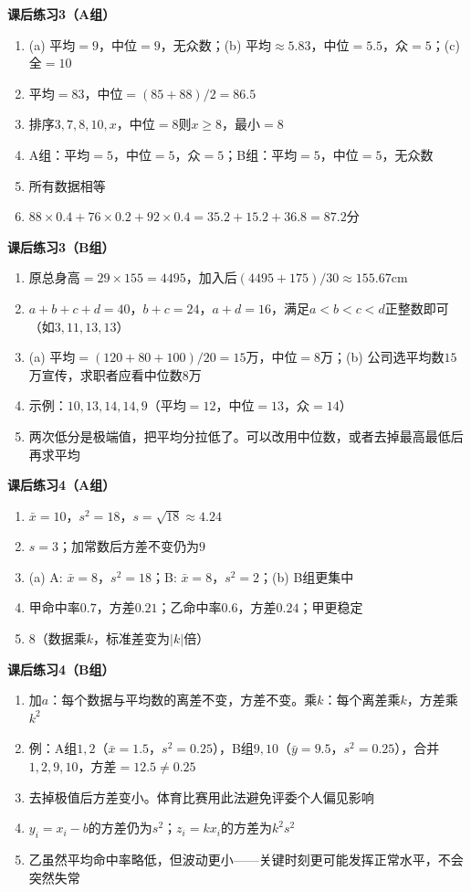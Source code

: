 \textbf{课后练习3（A组）}
\begin{enumerate}
\item (a) 平均$=9$，中位$=9$，无众数；(b) 平均$\approx5.83$，中位$=5.5$，众$=5$；(c) 全$=10$
\item 平均$=83$，中位$=(85+88)/2=86.5$
\item 排序$3,7,8,10,x$，中位$=8$则$x\ge8$，最小$=8$
\item A组：平均$=5$，中位$=5$，众$=5$；B组：平均$=5$，中位$=5$，无众数
\item 所有数据相等
\item $88\times0.4+76\times0.2+92\times0.4=35.2+15.2+36.8=87.2$分
\end{enumerate}

\textbf{课后练习3（B组）}
\begin{enumerate}
\item 原总身高$=29\times155=4495$，加入后$(4495+175)/30\approx155.67$cm
\item $a+b+c+d=40$，$b+c=24$，$a+d=16$，满足$a<b<c<d$正整数即可（如$3,11,13,13$）
\item (a) 平均$=(120+80+100)/20=15$万，中位$=8$万；(b) 公司选平均数$15$万宣传，求职者应看中位数$8$万
\item 示例：$10,13,14,14,9$（平均$=12$，中位$=13$，众$=14$）
\item 两次低分是极端值，把平均分拉低了。可以改用中位数，或者去掉最高最低后再求平均
\end{enumerate}

\textbf{课后练习4（A组）}
\begin{enumerate}
\item $\bar x=10$，$s^2=18$，$s=\sqrt{18}\approx4.24$
\item $s=3$；加常数后方差不变仍为$9$
\item (a) A: $\bar x=8$，$s^2=18$；B: $\bar x=8$，$s^2=2$；(b) B组更集中
\item 甲命中率$0.7$，方差$0.21$；乙命中率$0.6$，方差$0.24$；甲更稳定
\item $8$（数据乘$k$，标准差变为$|k|$倍）
\end{enumerate}

\textbf{课后练习4（B组）}
\begin{enumerate}
\item 加$a$：每个数据与平均数的离差不变，方差不变。乘$k$：每个离差乘$k$，方差乘$k^2$
\item 例：A组$1,2$（$\bar x=1.5$，$s^2=0.25$），B组$9,10$（$\bar y=9.5$，$s^2=0.25$），合并$1,2,9,10$，方差$=12.5\neq0.25$
\item 去掉极值后方差变小。体育比赛用此法避免评委个人偏见影响
\item $y_i=x_i-b$的方差仍为$s^2$；$z_i=kx_i$的方差为$k^2s^2$
\item 乙虽然平均命中率略低，但波动更小——关键时刻更可能发挥正常水平，不会突然失常
\end{enumerate}


